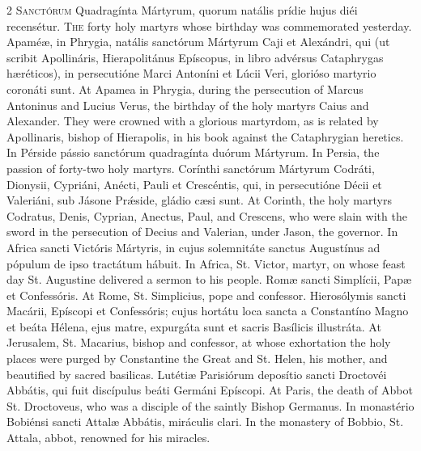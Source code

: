 \begin{paracol}{2}
\lettrine[lines=2]{S}{anctórum} Quadragínta Mártyrum, quorum natális prídie hujus diéi recensétur.
\switchcolumn
{}
\lettrine[lines=2]{T}{he} forty holy martyrs whose birthday was commemorated yesterday.
\switchcolumn*
{}
Apaméæ, in Phrygia, natális sanctórum Mártyrum 
 Caji et Alexándri, qui (ut scribit Apollináris, Hierapolitánus Epíscopus, in 
 libro advérsus Cataphrygas hæréticos), in persecutióne Marci Antoníni et 
 Lúcii Veri, glorióso martyrio coronáti sunt.
\switchcolumn
{}
At Apamea in Phrygia, during the persecution of Marcus Antoninus and Lucius 
 Verus, the birthday of the holy martyrs Caius and Alexander. They were 
 crowned with a glorious martyrdom, as is related by Apollinaris, bishop of 
 Hierapolis, in his book against the Cataphrygian heretics.
\switchcolumn*
{}
In Pérside pássio sanctórum quadragínta duórum Mártyrum.
\switchcolumn
{}
In Persia, the passion of forty-two holy martyrs.
\switchcolumn*
{}
Corínthi sanctórum Mártyrum Codráti, Dionysii, Cypriáni, Anécti, Pauli et 
 Crescéntis, qui, in persecutióne Décii et Valeriáni, sub Jásone 
 Prǽside, gládio cæsi sunt.
\switchcolumn
{}
At Corinth, the holy martyrs Codratus, Denis, Cyprian, Anectus, Paul, and 
 Crescens, who were slain with the sword in the persecution of Decius and 
 Valerian, under Jason, the governor.
\switchcolumn*
{}
In Africa sancti Victóris Mártyris, in cujus solemnitáte sanctus Augustínus 
 ad pópulum de ipso tractátum hábuit.
\switchcolumn
{}
In Africa, St. Victor, martyr, on whose feast day St. Augustine delivered a 
 sermon to his people.
\switchcolumn*
{}
Romæ sancti Simplícii, Papæ et Confessóris.
\switchcolumn
{}
At Rome, St. Simplicius, pope and confessor.
\switchcolumn*
{}
Hierosólymis sancti Macárii, Epíscopi et Confessóris; cujus hortátu loca 
 sancta a Constantíno Magno et beáta Hélena, 
 ejus matre, expurgáta sunt et sacris Basílicis illustráta.
\switchcolumn
{}
At Jerusalem, St. Macarius, bishop and confessor, at whose exhortation the 
 holy places were purged by Constantine the Great and St. Helen, his mother, 
 and beautified by sacred basilicas.
\switchcolumn*
{}
Lutétiæ Parisiórum deposítio sancti Droctovéi 
 Abbátis, qui fuit discípulus beáti Germáni Epíscopi.
\switchcolumn
{}
At Paris, the death of Abbot St. Droctoveus, who was a disciple of the 
 saintly Bishop Germanus.
\switchcolumn*
{}
In monastério Bobiénsi sancti Attalæ Abbátis, 
 miráculis clari.
\switchcolumn
{}
In the monastery of Bobbio, St. Attala, abbot, renowned for his miracles.
\switchcolumn*
{}
\end{paracol}


